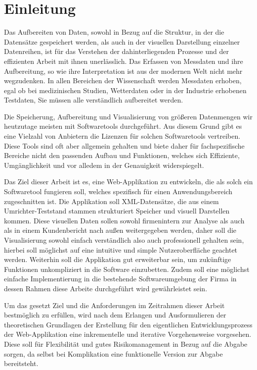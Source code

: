 


\newpage
\section{Einleitung}
\label{sec:einleitung}
Das Aufbereiten von
Daten, sowohl in Bezug auf die Struktur, in der die Datensätze gespeichert werden,
als auch in der visuellen Darstellung einzelner Datenreihen, ist für das
Verstehen der dahinterliegenden Prozesse und der effizienten Arbeit mit ihnen unerlässlich.
Das Erfassen von Messdaten und ihre Aufbereitung, so wie ihre Interpretation
ist aus der modernen Welt nicht mehr wegzudenken.
In allen Bereichen der Wissenschaft werden Messdaten erhoben, egal ob bei medizinischen Studien,
Wetterdaten oder in der Industrie erhobenen Testdaten, Sie müssen alle
verständlich aufbereitet werden.

Die Speicherung,
Aufbereitung und Visualisierung von größeren Datenmengen wir heutzutage meisten mit Softwaretools durchgeführt.
Aus diesem Grund gibt es eine Vielzahl von Anbietern die
Lizenzen für solchen Softwaretools vertreiben.
Diese Tools sind oft aber allgemein gehalten und biete daher für fachspezifische Bereiche nicht den
passenden Aufbau und Funktionen, welches sich Effiziente, Umgänglichkeit und
vor alledem in der Genauigkeit widerspiegelt.

Das Ziel dieser Arbeit
ist es, eine Web-Applikation zu entwickeln, die als solch ein Softwaretool
fungieren soll, welches spezifisch für einen Anwendungsbereich zugeschnitten ist.
Die Applikation soll XML-Datensätze, die aus einem Umrichter-Teststand
stammen strukturiert Speicher und visuell Darstellen kommen.
Diese visuellen Daten sollen sowohl firmenintern zur Analyse als auch als in einem
Kundenbericht nach außen weitergegeben werden, daher soll die Visualisierung sowohl
einfach verständlich also auch professionell gehalten sein, hierbei soll
möglichst auf eine intuitive und simple Nutzeroberfläche geachtet werden.
Weiterhin soll die Applikation gut erweiterbar sein, um zukünftige Funktionen
unkompliziert in die Software einzubetten.
Zudem soll eine möglichst einfache Implementierung in die bestehende Softwareumgebung der Firma in dessen Rahmen
diese Arbeite durchgeführt wird gewährleistet sein.

Um das gesetzt Ziel und
die Anforderungen im Zeitrahmen dieser Arbeit bestmöglich zu erfüllen, wird nach
dem Erlangen und Ausformulieren der theoretischen Grundlagen der Erstellung für
den eigentlichen Entwicklungsprozess der Web-Applikation eine inkrementelle und
iterative Vorgehensweise vorgesehen.
Diese soll für Flexibilität und gutes Risikomanagement in Bezug auf die Abgabe sorgen, da selbst bei Komplikation
eine funktionelle Version zur Abgabe bereitsteht.

